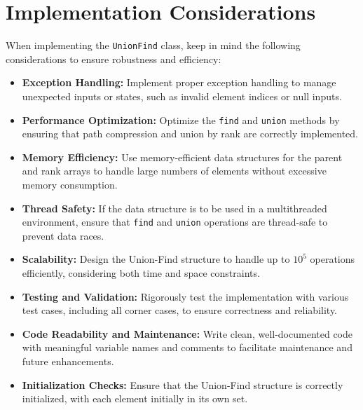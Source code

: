 \section*{Implementation Considerations}

When implementing the \texttt{UnionFind} class, keep in mind the following considerations to ensure robustness and efficiency:

\begin{itemize}
    \item \textbf{Exception Handling:}  
    Implement proper exception handling to manage unexpected inputs or states, such as invalid element indices or null inputs.
    
    \item \textbf{Performance Optimization:}  
    Optimize the \texttt{find} and \texttt{union} methods by ensuring that path compression and union by rank are correctly implemented.
    
    \item \textbf{Memory Efficiency:}  
    Use memory-efficient data structures for the parent and rank arrays to handle large numbers of elements without excessive memory consumption.
    
    \item \textbf{Thread Safety:}  
    If the data structure is to be used in a multithreaded environment, ensure that \texttt{find} and \texttt{union} operations are thread-safe to prevent data races.
    
    \item \textbf{Scalability:}  
    Design the Union-Find structure to handle up to \(10^5\) operations efficiently, considering both time and space constraints.
    
    \item \textbf{Testing and Validation:}  
    Rigorously test the implementation with various test cases, including all corner cases, to ensure correctness and reliability.
    
    \item \textbf{Code Readability and Maintenance:}  
    Write clean, well-documented code with meaningful variable names and comments to facilitate maintenance and future enhancements.
    
    \item \textbf{Initialization Checks:}  
    Ensure that the Union-Find structure is correctly initialized, with each element initially in its own set.
\end{itemize}

